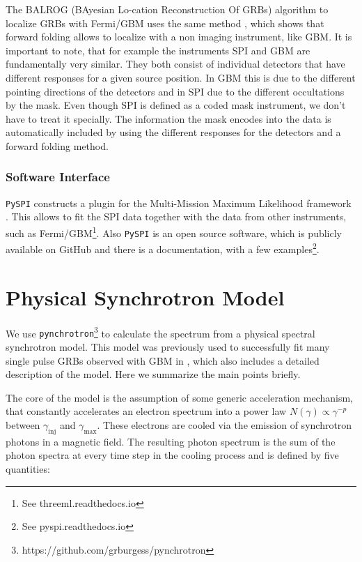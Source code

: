 \documentclass[twocolumn]{aa}
\begin{document}
The BALROG (BAyesian Lo-cation Reconstruction Of GRBs) algorithm to localize GRBs with Fermi/GBM uses the same method \citep{balrog}, which shows that forward folding allows to localize with a non imaging instrument, like GBM. It is important to note, that for example the instruments SPI and GBM are fundamentally very similar. They both consist of individual detectors that have different responses for a given source position. In GBM this is due to the different pointing directions of the detectors and in SPI due to the different occultations by the mask. Even though SPI is defined as a coded mask instrument, we don't have to treat it specially. The information the mask encodes into the data is automatically included by using the different responses for the detectors and a forward folding method.

\subsubsection{Software Interface}

{\tt PySPI} constructs a plugin for the Multi-Mission Maximum Likelihood framework \citep[3ML][]{3ML}. This allows to fit the SPI data together with the data from other instruments, such as Fermi/GBM\footnote{See threeml.readthedocs.io}. Also {\tt PySPI} is an open source software, which is publicly available on GitHub \citep{joss} and there is a documentation, with a few examples\footnote{See pyspi.readthedocs.io}.

\section{Physical Synchrotron Model}
\label{synch}
We use {\tt pynchrotron}\footnote{https://github.com/grburgess/pynchrotron} to calculate the spectrum from a physical spectral synchrotron model. This model was previously used to successfully fit many single pulse GRBs observed with GBM in \citet{synch}, which also includes a detailed description of the model. Here we summarize the main points briefly.

The core of the model is the assumption of some generic acceleration mechanism, that constantly accelerates an electron spectrum into a power law $N(\gamma )\propto \gamma^{-p}$ between $\gamma_{\textrm{inj}}$ and $\gamma_{\textrm{max}}$. These electrons are cooled via the emission of synchrotron photons in a magnetic field. The resulting photon spectrum is the sum of the photon spectra at every time step in the cooling process and is defined by five quantities:
\end{document}
